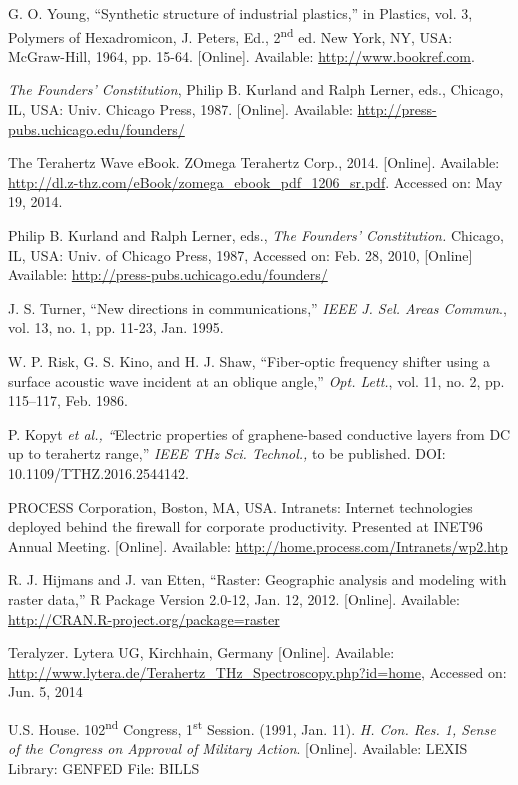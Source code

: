 \documentclass[journal,twoside,web]{ieeecolor}
\begin{document}
\begin{thebibliography}{00}
 G. O. Young, ``Synthetic structure of industrial
plastics,'' in Plastics, vol. 3, Polymers of Hexadromicon, J. Peters,
Ed., 2\textsuperscript{nd} ed. New York, NY, USA: McGraw-Hill, 1964, pp. 15-64.
[Online]. Available:
\underline{http://www.bookref.com}.

 \emph{The Founders' Constitution}, Philip B. Kurland
and Ralph Lerner, eds., Chicago, IL, USA: Univ. Chicago Press, 1987.
[Online]. Available: \underline{http://press-pubs.uchicago.edu/founders/}

 The Terahertz Wave eBook. ZOmega Terahertz Corp., 2014.
[Online]. Available:
\underline{http://dl.z-thz.com/eBook/zomega\_ebook\_pdf\_1206\_sr.pdf}. Accessed on: May 19, 2014.

 Philip B. Kurland and Ralph Lerner, eds., \emph{The
Founders' Constitution.} Chicago, IL, USA: Univ. of Chicago Press,
1987, Accessed on: Feb. 28, 2010, [Online] Available:
\underline{http://press-pubs.uchicago.edu/founders/}

 J. S. Turner, ``New directions in communications,'' \emph{IEEE J. Sel. Areas Commun}., vol. 13, no. 1, pp. 11-23, Jan. 1995.

 W. P. Risk, G. S. Kino, and H. J. Shaw, ``Fiber-optic frequency shifter using a surface acoustic wave incident at an oblique angle,'' \emph{Opt. Lett.}, vol. 11, no. 2, pp. 115--117, Feb. 1986.

 P. Kopyt \emph{et al., ``}Electric properties of graphene-based conductive layers from DC up to terahertz range,'' \emph{IEEE THz Sci. Technol.,} to be published. DOI: 10.1109/TTHZ.2016.2544142.

 PROCESS Corporation, Boston, MA, USA. Intranets:
Internet technologies deployed behind the firewall for corporate
productivity. Presented at INET96 Annual Meeting. [Online].
Available: \underline{http://home.process.com/Intranets/wp2.htp}

 R. J. Hijmans and J. van Etten, ``Raster: Geographic analysis and modeling with raster data,'' R Package Version 2.0-12, Jan. 12, 2012. [Online]. Available: \underline {http://CRAN.R-project.org/package=raster} 

 Teralyzer. Lytera UG, Kirchhain, Germany [Online].
Available:
\underline{http://www.lytera.de/Terahertz\_THz\_Spectroscopy.php?id=home}, Accessed on: Jun. 5, 2014

 U.S. House. 102\textsuperscript{nd} Congress, 1\textsuperscript{st} Session. (1991, Jan. 11). \emph{H. Con. Res. 1, Sense of the Congress on Approval of}  \emph{Military Action}. [Online]. Available: LEXIS Library: GENFED File: BILLS


\end{thebibliography}
\end{document}
